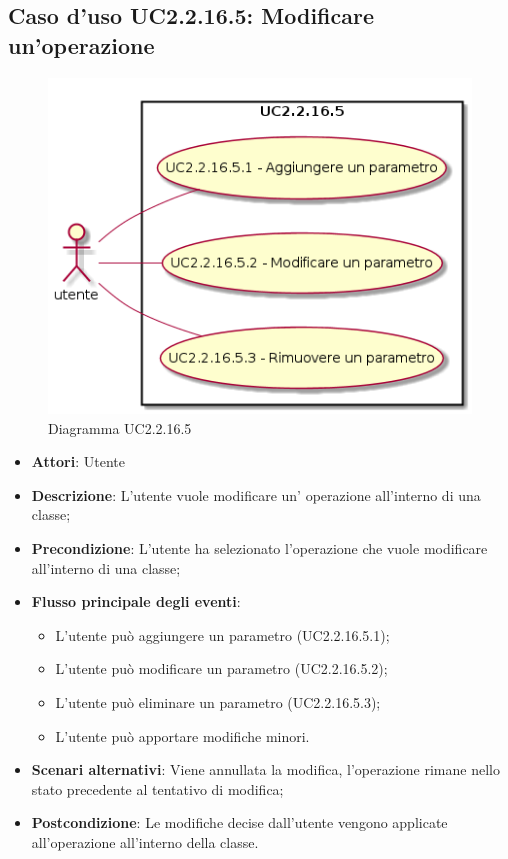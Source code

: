 \documentclass[../AnalisiDeiRequisiti.tex]{subfiles}
\begin{document}
			\subsection{Caso d'uso UC2.2.16.5: Modificare un'operazione}
			\begin{figure} [H]
				\centering
				\includegraphics[scale=0.45]{./Figures/UC2-2-16-5.png}
				\caption{Diagramma UC2.2.16.5}\label{}
			\end{figure}
			\begin{itemize}
				\item \textbf{Attori}: Utente
				\item \textbf{Descrizione}: L'utente vuole modificare un' operazione all'interno di una classe;
				\item \textbf{Precondizione}: L'utente ha selezionato l'operazione che vuole modificare all'interno di una classe;
				\item \textbf{Flusso principale degli eventi}: \begin{itemize}
					\item L'utente può aggiungere un parametro (UC2.2.16.5.1);
					\item L'utente può modificare un parametro (UC2.2.16.5.2);
					\item L'utente può eliminare un parametro (UC2.2.16.5.3);
					\item L'utente può apportare modifiche minori.
				\end{itemize}
				\item \textbf{Scenari alternativi}: Viene annullata la modifica, l'operazione rimane nello stato precedente al tentativo di modifica;
				\item \textbf{Postcondizione}: Le modifiche decise dall'utente vengono applicate all'operazione all'interno della classe.
			\end{itemize}
\end{document}
